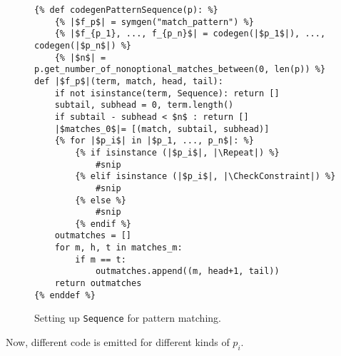 \begin{figure}[htb]
\centering
\begin{verbatim}
{% def codegenPatternSequence(p): %}
	{% |$f_p$| = symgen("match_pattern") %}
	{% |$f_{p_1}, ..., f_{p_n}$| = codegen(|$p_1$|), ...,  codegen(|$p_n$|) %}
	{% |$n$| = p.get_number_of_nonoptional_matches_between(0, len(p)) %}
def |$f_p$|(term, match, head, tail):
	if not isinstance(term, Sequence): return []
	subtail, subhead = 0, term.length()
	if subtail - subhead < $n$ : return []
	|$matches_0$|= [(match, subtail, subhead)]
	{% for |$p_i$| in |$p_1, ..., p_n$|: %}
		{% if isinstance (|$p_i$|, |\Repeat|) %}
			#snip
		{% elif isinstance (|$p_i$|, |\CheckConstraint|) %}
			#snip
		{% else %}
			#snip
		{% endif %}
	outmatches = []
	for m, h, t in matches_m:
		if m == t:
			outmatches.append((m, head+1, tail))
	return outmatches
{% enddef %}
\end{verbatim}
\caption{Setting up \texttt{Sequence} for pattern matching.}
\label{codegen-pattern-seq-1}
\end{figure}

Now, different code is emitted for different kinds of $p_i$. 


